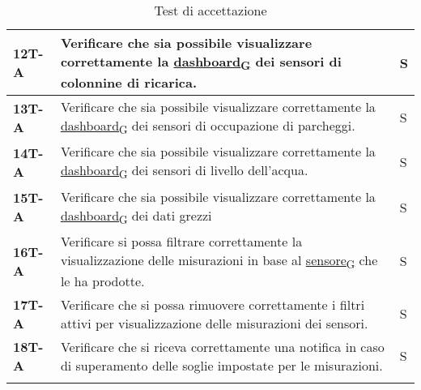 \begin{longtable}{|>{\raggedright\arraybackslash}m{}|>{\raggedright\arraybackslash}m{}|>{\raggedright\arraybackslash}m{}|}
	\hline
	\textbf{12T-A}  & Verificare che sia possibile visualizzare correttamente la \href{https://7last.github.io/docs/pb/documentazione-interna/glossario\#dashboard}{dashboard\textsubscript{G}} dei sensori di colonnine di ricarica.                                                                                                 & S              \\
	\hline
	\textbf{13T-A}  & Verificare che sia possibile visualizzare correttamente la \href{https://7last.github.io/docs/pb/documentazione-interna/glossario\#dashboard}{dashboard\textsubscript{G}} dei sensori di occupazione di parcheggi.                                                                                              & S              \\
	\hline
	\textbf{14T-A}  & Verificare che sia possibile visualizzare correttamente la \href{https://7last.github.io/docs/pb/documentazione-interna/glossario\#dashboard}{dashboard\textsubscript{G}} dei sensori di livello dell'acqua.                                                                                                    & S              \\
	\hline
	\textbf{15T-A}  & Verificare che sia possibile visualizzare correttamente la \href{https://7last.github.io/docs/pb/documentazione-interna/glossario\#dashboard}{dashboard\textsubscript{G}} dei dati grezzi                                                                                                                       & S              \\
	\hline
	\textbf{16T-A}  & Verificare si possa filtrare correttamente la visualizzazione delle misurazioni in base al \href{https://7last.github.io/docs/pb/documentazione-interna/glossario\#sensore}{sensore\textsubscript{G}} che le ha prodotte.                                                                                       & S              \\
	\hline
	\textbf{17T-A}  & Verificare che si possa rimuovere correttamente i filtri attivi per visualizzazione delle misurazioni dei sensori.                                                                                                                                                                                              & S              \\
	\hline
	\textbf{18T-A}  & Verificare che si riceva correttamente una notifica in caso di superamento delle soglie impostate per le misurazioni.                                                                                                                                                                                           & S              \\
	\hline
	\caption{Test di accettazione}
\end{longtable}
